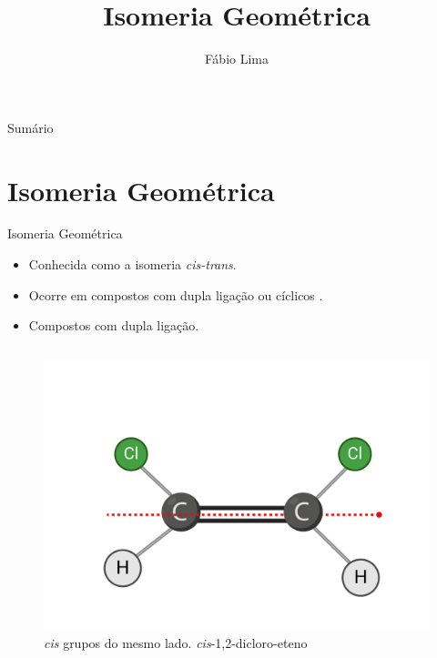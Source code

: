 \documentclass[presentation,professionalfonts,aspectratio=169]{beamer}
\date{}
\author{Fábio Lima}
\date{}
\title{ Isomeria Geométrica}
\begin{document}
\maketitle
\begin{frame}{Sumário}
\tableofcontents
\end{frame}


\section{Isomeria Geométrica}
\label{sec:orgc9ec6eb}

\begin{frame}[label={sec:orgcf42248}]{Isomeria Geométrica}
\begin{itemize}
\item Conhecida como a isomeria \emph{cis-trans}.
\item Ocorre em compostos com dupla ligação ou cíclicos .
\item Compostos com dupla ligação.
\end{itemize}


\begin{columns}
\begin{column}{0.4\columnwidth}
\begin{figure}[htbp]
\centering
\includegraphics[width=.9\linewidth]{QO/Isomeria/CIS.png}
\caption{\emph{cis} grupos do mesmo lado. \emph{cis}-1,2-dicloro-eteno}
\end{figure}
\end{column}


\end{columns}
\end{frame}
\end{document}
